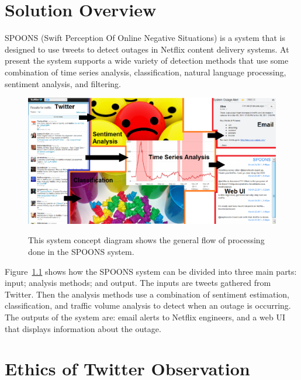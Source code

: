 \documentclass[12pt]{ucthesis}
\newcommand{\captionfonts}{\small\bf\ssp}
\begin{document}
\chapter{Solution Overview}
\label{overview}

SPOONS (Swift Perception Of Online Negative Situations) is a system that is
designed to use tweets to detect outages in Netflix content delivery systems. At present the system
supports a wide variety of detection methods that use some combination of time
series analysis, classification, natural language processing, sentiment
analysis, and filtering.

\begin{figure}
   \begin{center}
      \includegraphics[width=140mm]{images/systemFlow.eps}
      \captionfonts
      \caption[System Concept Diagram]{This system concept diagram shows the general
                                       flow of processing done in the SPOONS system.}
      \label{fig:systemFlow}
   \end{center}
\end{figure}

Figure~\ref{fig:systemFlow} shows how the SPOONS system can be divided into three
main parts: {\color{blue}input}; {\color{orange}analysis methods}; and
{\color{red}output}. The inputs are tweets gathered from Twitter. Then the
analysis methods use a combination of sentiment estimation, classification, and
traffic volume analysis to detect when an outage is occurring.
The outputs of the system are: email alerts to Netflix engineers, and a web UI that displays
information about the outage.

\chapter{Ethics of Twitter Observation}
\end{document}
